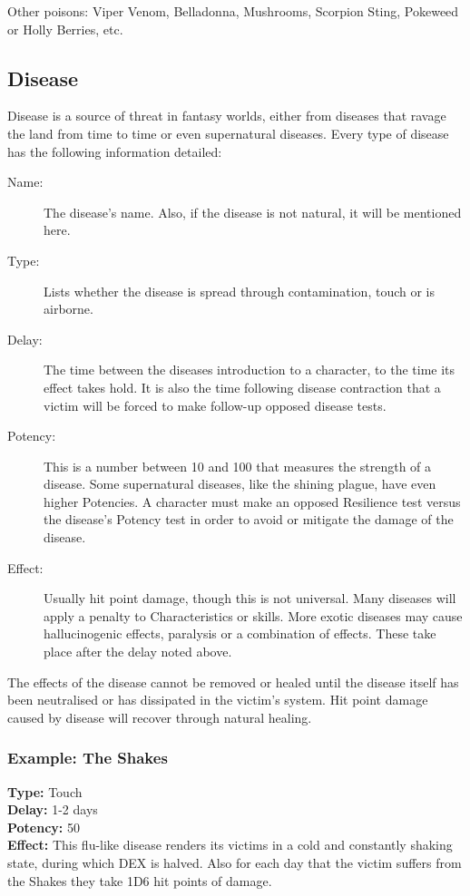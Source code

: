 Other poisons: Viper Venom, Belladonna, Mushrooms, Scorpion Sting, Pokeweed or Holly Berries, etc.

\subsection{Disease}
\label{ssec:disease}
Disease is a source of threat in fantasy worlds, either from diseases that ravage the land from time to time or even supernatural diseases.
Every type of disease has the following information detailed: 

\begin{description}
	\item[Name:] The disease’s name. Also, if the disease is not natural, it will be mentioned here. 
	\item[Type:] Lists whether the disease is spread through contamination, touch or is airborne. 
	\item[Delay:] The time between the diseases introduction to a character, to the time its effect takes hold. It is also the time following disease contraction that a victim will be forced to make follow-up opposed disease tests.
	\item[Potency:] This is a number between 10 and 100 that measures the strength of a disease. Some supernatural diseases, like the shining plague, have even higher Potencies. A character must make an opposed Resilience test versus the disease’s Potency test in order to avoid or mitigate the damage of the disease.
	\item[Effect:] Usually hit point damage, though this is not universal. Many diseases will apply a penalty to Characteristics or skills. More exotic diseases may cause hallucinogenic effects, paralysis or a combination of effects. These take place after the delay noted above. 
\end{description}

The effects of the disease cannot be removed or healed until the disease itself has been neutralised or has dissipated in the victim’s system. Hit point damage caused by disease will recover through natural healing.

\subsubsection{Example: The Shakes}

\noindent\textbf{Type:} Touch\\
\noindent\textbf{Delay:} 1-2 days\\
\noindent\textbf{Potency:} 50\\
\noindent\textbf{Effect:} This flu-like disease renders its victims in a cold and constantly shaking state, during which DEX is halved. Also for each day that the victim suffers from the Shakes they take 1D6 hit points of damage.\\

